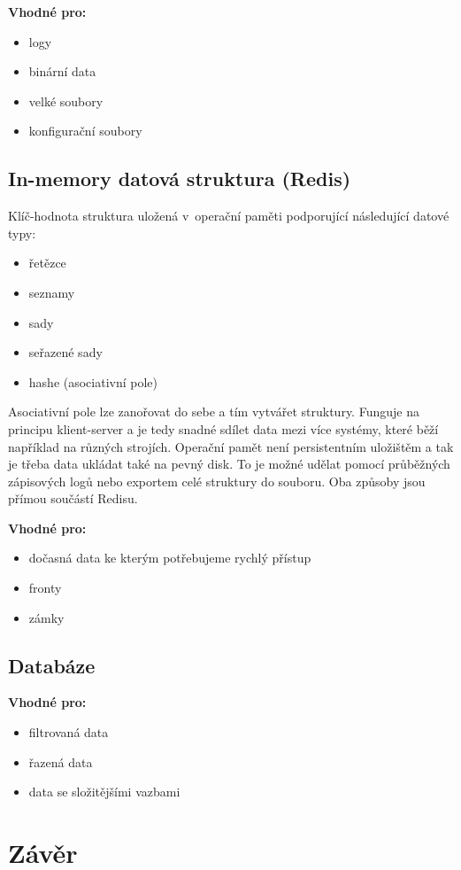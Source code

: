 \textbf{Vhodné pro:}
\begin{itemize}
	\item logy
	\item binární data
	\item velké soubory
	\item konfigurační soubory
\end{itemize}

\subsection{In-memory datová struktura (Redis)}

Klíč-hodnota struktura uložená v~operační paměti podporující následující datové typy:

\begin{itemize}
	\item řetězce
	\item seznamy
	\item sady
	\item seřazené sady
	\item hashe (asociativní pole)
\end{itemize}

Asociativní pole lze zanořovat do sebe a tím vytvářet struktury.
Funguje na principu klient-server a je tedy snadné sdílet data mezi více systémy, které běží například na různých strojích.
Operační pamět není persistentním uložištěm a tak je třeba data ukládat také na pevný disk.
To je možné udělat pomocí průběžných zápisových logů nebo exportem celé struktury do souboru.
Oba způsoby jsou přímou součástí Redisu.

\medskip\noindent
\textbf{Vhodné pro:}
\begin{itemize}
	\item dočasná data ke kterým potřebujeme rychlý přístup
	\item fronty
	\item zámky
\end{itemize}

\subsection{Databáze}

\medskip\noindent
\textbf{Vhodné pro:}
\begin{itemize}
	\item filtrovaná data
	\item řazená data
	\item data se složitějšími vazbami
\end{itemize}

\section{Závěr}

